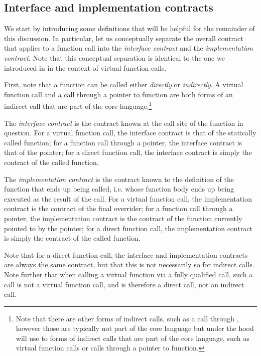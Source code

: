 \subsection{Interface and implementation contracts}

We start by introducing some definitions that will be helpful for the remainder of this discussion. In particular, let us conceptually separate the overall contract that applies to a function call into the \emph{interface contract} and the \emph{implementation contract}. Note that this conceptual separation is identical to the one we introduced in \cite{P3097R0} in the context of virtual function calls.

First, note that a function can be called either \emph{directly} or \emph{indirectly}. A virtual function call and a call through a pointer to function are both forms of an indirect call that are part of the core language.\footnote{Note that there are other forms of indirect calls, such as a call through , however those are typically not part of the core language but under the hood will use to forms of indirect calls that are part of the core language, such as virtual function calls or calls through a pointer to function.}

The \emph{interface contract} is the contract known at the call site of the function in question. For a virtual function call, the interface contract is that of the statically called function; for a function call through a pointer, the interface contract is that of the pointer; for a direct function call, the interface contract is simply the contract of the called function.

The \emph{implementation contract} is the contract known to the definition of the function that ends up being called, i.e. whose function body ends up being executed as the result of the call. For a virtual function call, the implementation contract is the contract of the final overrider; for a function call through a pointer, the implementation contract is the contract of the function currently pointed to by the pointer; for a direct function call, the implementation contract is simply the contract of the called function.

Note that for a direct function call, the interface and implementation contracts are always the same contract, but that this is not necessarily so for indirect calls. Note further that when calling a virtual function via a fully qualified call, such a call is not a virtual function call, and is therefore a direct call, not an indirect call.

